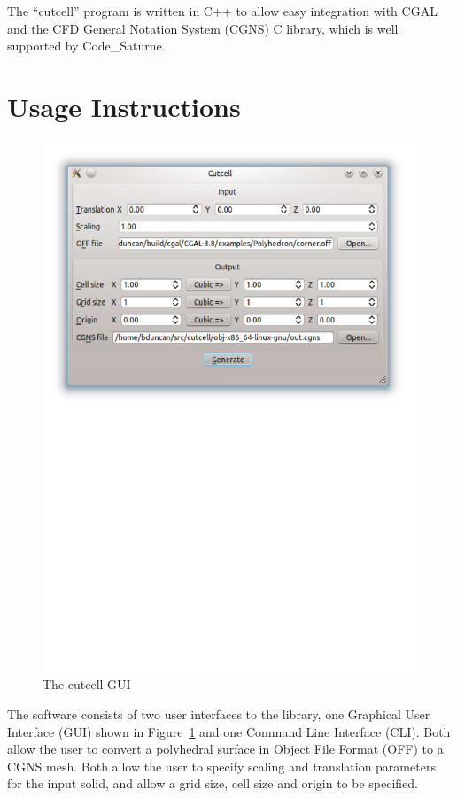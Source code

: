 \documentclass[a4paper,10pt]{article}
\begin{document}
The ``cutcell'' program is written in C++ to allow easy integration with CGAL
and the CFD General Notation System (CGNS) \cite{cgns} C library, which is well
supported by Code\_Saturne.

\section{Usage Instructions}

\begin{figure}[!tbh]
 \centering
 \includegraphics[keepaspectratio=true,width=\textwidth]{./cutcellgui.pdf}
 \caption{The cutcell GUI}
 \label{fig:gui}
\end{figure}

The software consists of two user interfaces to the library, one Graphical User
Interface (GUI) shown in Figure~\ref{fig:gui} and one Command Line Interface
(CLI). Both allow the user to convert a polyhedral surface in Object File Format
(OFF) to a CGNS mesh. Both allow the user to specify scaling and translation
parameters for the input solid, and allow a grid size, cell size and origin to
be specified.
\end{document}
